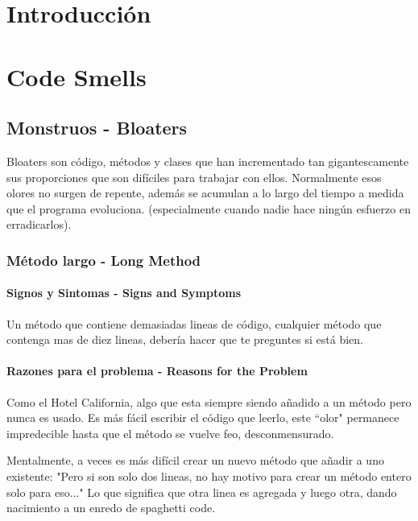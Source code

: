 \documentclass[11pt,a4paper,oneside]{book}
\begin{document}
 
\chapter{Introducción}

\chapter{Code Smells}



\section{Monstruos - Bloaters}
\label{bloaters}
Bloaters son código, métodos y clases que han incrementado tan gigantescamente sus proporciones que son difíciles para trabajar con ellos. Normalmente esos olores no surgen de repente, además se acumulan a lo largo del tiempo a medida que el programa evoluciona. (especialmente cuando nadie hace ningún esfuerzo en erradicarlos).

\subsection{Método largo -   Long Method}
\label{metodolargo}
\subsubsection{Signos y Sintomas - Signs and Symptoms}

Un método que contiene demasiadas lineas de código, cualquier método que contenga mas de diez lineas, debería hacer que te preguntes si está bien.



\subsubsection{Razones para el problema - Reasons for the Problem}

Como el Hotel California, algo que esta siempre siendo añadido a un método pero nunca es usado. Es más fácil escribir el código que leerlo, este ``olor" permanece impredecible hasta que el método se vuelve feo, desconmensurado. 

Mentalmente, a veces es más difícil crear un nuevo método que añadir a uno existente: "Pero si son solo dos lineas, no hay motivo para crear un método entero solo para eso..." Lo que significa que otra linea es agregada y luego otra, dando nacimiento a un enredo de spaghetti code. 
\end{document}
